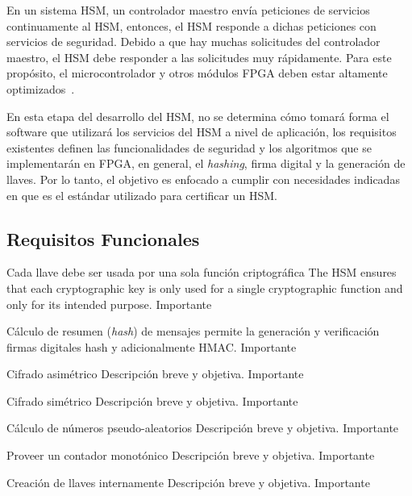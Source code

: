\documentclass[a4paper]{article}
\begin{document}
En un sistema HSM, un controlador maestro envía peticiones de servicios continuamente al HSM, entonces, el HSM responde a dichas peticiones con servicios de seguridad. Debido a que hay muchas solicitudes del controlador maestro, el HSM debe responder a las solicitudes muy rápidamente. Para este propósito, el microcontrolador y otros módulos FPGA deben estar altamente optimizados~\cite{evita-hsm:2012}. 

En esta etapa del desarrollo del HSM, no se determina cómo tomará forma el software que utilizará los servicios del HSM a nivel de aplicación, los requisitos existentes definen las funcionalidades de seguridad y los algoritmos que se implementarán en FPGA, en general, el \textit{hashing}, firma digital y la generación de llaves. Por lo tanto, el objetivo es enfocado a cumplir con necesidades indicadas en \cite{std-fips-140-2:2005} que es el estándar utilizado para certificar un HSM.

    \subsection{Requisitos Funcionales}
    \begin{functional}
          {Cada llave debe ser usada por una sola función criptográfica}
      {The HSM ensures that each cryptographic key is only used for a single cryptographic function and only for its intended purpose.}
      {Importante}
    
      {Cálculo de resumen (\textit{hash}) de mensajes}
      {permite la generación y verificación firmas digitales hash y adicionalmente HMAC.}
      {Importante}
            
      {Cifrado asimétrico}
      {Descripción breve y objetiva.}
      {Importante}
            
      {Cifrado simétrico}
      {Descripción breve y objetiva.}
      {Importante}
            
      {Cálculo de números pseudo-aleatorios}
      {Descripción breve y objetiva.}
      {Importante}
            
            {Proveer un contador monotónico}
            {Descripción breve y objetiva.}
            {Importante}
            
            {Creación de llaves internamente}
            {Descripción breve y objetiva.}
            {Importante}
            
    \end{functional}
\end{document}
